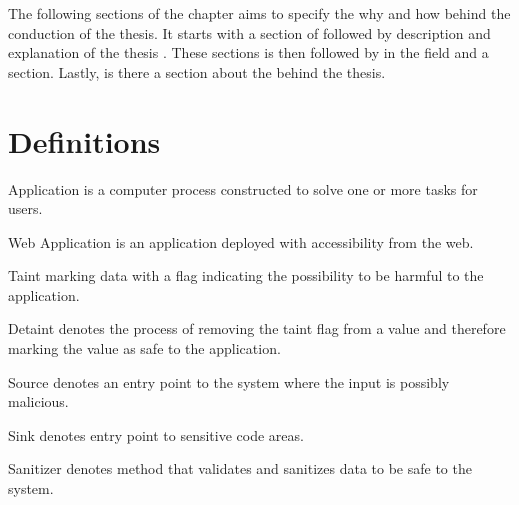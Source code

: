 The following sections of the chapter aims to specify the why and how behind the conduction of the thesis. It starts with a section of \textit{} followed by \textit{} description and explanation of the thesis \textit{}. These sections is then followed by \textit{} in the field and a \textit{} section. Lastly, is there a section about the \textit{} behind the thesis.


\section{Definitions}
\label{Definitions}
\begin{definition}{Application}
    is a computer process constructed to solve one or more tasks for users.
    \\
\end{definition}

\begin{definition}{Web Application}
    is an application deployed with accessibility from the web.
    \\
\end{definition}

\begin{definition}{Taint}
    marking data with a flag indicating the possibility to be harmful to the application.
    \\
\end{definition}

\begin{definition}{Detaint}
    denotes the process of removing the taint flag from a value and therefore marking the value as safe to the application.
    \\
\end{definition}

\begin{definition}{Source}
    denotes an entry point to the system where the input is possibly malicious.
    \\
\end{definition}

\begin{definition}{Sink}
    denotes entry point to sensitive code areas.
    \\
\end{definition}

\begin{definition}{Sanitizer}
    denotes method that validates and sanitizes data to be safe to the system.
    \\
\end{definition}


